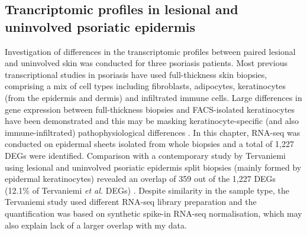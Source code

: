 \subsection{Trancriptomic profiles in lesional and uninvolved psoriatic epidermis}
Investigation of differences in the transcriptomic profiles between paired lesional and uninvolved skin was conducted for three psoriasis patients. Most previous transcriptional studies in psoriasis have used full-thickness skin biopsies, comprising a mix of cell types including fibroblasts, adipocytes, keratinocytes (from the epidermis and dermis) and infiltrated immune cells. Large differences in gene expression between full-thickness biopsies and FACS-isolated keratinocytes have been demonstrated and this may be masking keratinocyte-specific (and also immune-infiltrated) pathophysiological differences \parencite{Ahn2016}. In this chapter, RNA-seq was conducted on epidermal sheets isolated from whole biopsies and a total of 1,227 DEGs were identified. Comparison with a contemporary study by Tervaniemi using lesional and uninvolved psoriatic epidermis split biopsies (mainly formed by epidermal keratinocytes) revealed an overlap of 359 out of the 1,227 DEGs (12.1\% of Tervaniemi \textit{et al.} DEGs) \parencite{Tervaniemi2016}. Despite similarity in the sample type, the Tervaniemi study used different RNA-seq library preparation and the quantification was based on synthetic spike-in RNA-seq normalisation, which may also explain lack of a larger overlap with my data.






